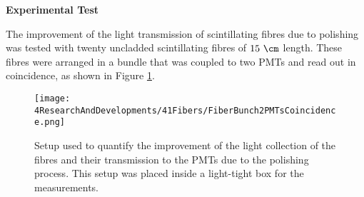 \textbf{Experimental Test}

The improvement of the light transmission of scintillating fibres due to polishing was tested with twenty uncladded scintillating fibres of $15~\cm$ length. These fibres were arranged in a bundle that was coupled to two PMTs and read out in coincidence, as shown in Figure \ref{fig:BunchWith2PMTsCoincidence}.

\begin{figure}[]
\centering
\texttt{[image: 4ResearchAndDevelopments/41Fibers/FiberBunch2PMTsCoincidence.png]}
\caption{Setup used to quantify the improvement of the light collection of the fibres and their transmission to the PMTs due to the polishing process. This setup was placed inside a light-tight box for the measurements.\label{fig:BunchWith2PMTsCoincidence}}
\end{figure}

